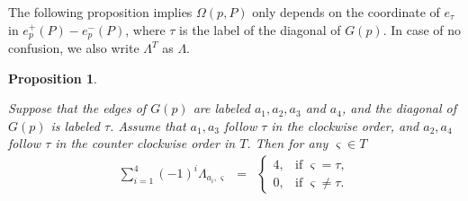 \documentclass[10pt]{amsart}
\theoremstyle{theorems}
\newtheorem{Proposition}[Theorem]{Proposition}
\begin{document}
\medskip

The following proposition implies $\Omega(p,P)$ only depends on the coordinate of $e_{\tau}$ in $e_p^{+}(P)-e_p^{-}(P)$, where $\tau$ is the label of the diagonal of $G(p)$. In case of no confusion, we also write $\Lambda^T$ as $\Lambda$.

\medskip

\begin{Proposition}\label{brick}

Suppose that the edges of $G(p)$ are labeled $a_1,a_2,a_3$ and $a_4$, and the diagonal of $G(p)$ is labeled $\tau$. Assume that $a_1, a_3$ follow $\tau$ in the clockwise order, and $a_2, a_4$ follow $\tau$ in the counter clockwise order in $T$. Then for any $\varsigma\in T$
 \[\begin{array}{ccl} \sum_{i=1}^{4}(-1)^{i}\Lambda_{a_i,\varsigma} &=&

         \left\{\begin{array}{ll}

             4, &\mbox{if $\varsigma=\tau$}, \\

             0, &\mbox{if $\varsigma\neq \tau$.}

         \end{array}\right.

 \end{array}\]

\end{Proposition}
\end{document}
